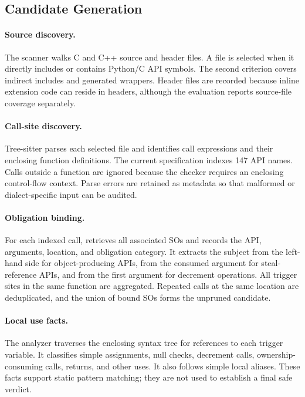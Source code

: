 \subsection{Candidate Generation}

\paragraph{Source discovery.}
The scanner walks C and C++ source and header files. A file is selected when it
directly includes  or contains Python/C API symbols. The second
criterion covers indirect includes and generated wrappers. Header files are
recorded because inline extension code can reside in headers, although the
evaluation reports source-file coverage separately.

\paragraph{Call-site discovery.}
Tree-sitter parses each selected file and identifies call expressions and their
enclosing function definitions. The current specification indexes 147 API
names. Calls outside a function are ignored because the checker requires an
enclosing control-flow context. Parse errors are retained as metadata so that
malformed or dialect-specific input can be audited.

\paragraph{Obligation binding.}
For each indexed call, \tool retrieves all associated SOs and records the API,
arguments, location, and obligation category. It extracts the subject from the
left-hand side for object-producing APIs, from the consumed argument for
steal-reference APIs, and from the first argument for decrement operations.
All trigger sites in the same function are aggregated. Repeated calls at the
same location are deduplicated, and the union of bound SOs forms the unpruned
candidate.

\paragraph{Local use facts.}
The analyzer traverses the enclosing syntax tree for references to each
trigger variable. It classifies simple assignments, null checks, decrement
calls, ownership-consuming calls, returns, and other uses. It also follows
simple local aliases. These facts support static pattern matching; they are not
used to establish a final safe verdict.

